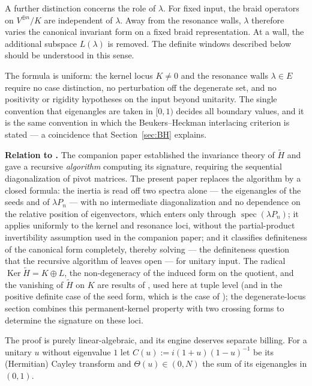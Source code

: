 \documentclass[11pt]{article}
\theoremstyle{definition}
\newcommand{\Ht}{\widetilde H}
\newcommand{\Ker}{\operatorname{Ker}}
\begin{document}
A further distinction concerns the role of $\lambda$. For fixed
input, the braid operators on $V^{\oplus n}/K$ are independent of
$\lambda$. Away from the resonance walls, $\lambda$ therefore varies
the canonical invariant form on a fixed braid representation. At a
wall, the additional subspace $L(\lambda)$ is removed. The definite
windows described below should be understood in this sense.

The formula is uniform: the kernel locus $K\neq0$ and the resonance
walls $\lambda\in E$ require no case distinction, no perturbation off
the degenerate set, and no positivity or rigidity hypotheses on the
input beyond unitarity. The single convention that eigenangles are
taken in $[0,1)$ decides all boundary values, and it is the same
convention in which the Beukers--Heckman interlacing criterion is
stated \cite{BH} --- a coincidence that Section~\ref{sec:BH} explains.


\medskip\noindent
\textbf{Relation to \cite{N-KLM}.} The companion paper \cite{N-KLM} established
the invariance theory of $\Ht$ and gave a recursive \emph{algorithm}
computing its signature, requiring the sequential diagonalization of
pivot matrices. The present paper replaces the algorithm by a closed
formula: the inertia is read off two spectra alone --- the eigenangles
of the seeds and of $\lambda P_n$ --- with no intermediate
diagonalization and no dependence on the relative position of
eigenvectors, which enters only through
$\operatorname{spec}(\lambda P_n)$; it applies uniformly to the
kernel and resonance loci, without the partial-product invertibility
assumption used in the companion paper; and it classifies
definiteness of the canonical form completely, thereby solving
\cite[Problem~18]{N-KLM} --- the definiteness question that the
recursive algorithm of \cite{N-KLM} leaves open --- for unitary
input. The radical $\Ker\Ht=K\oplus L$, the non-degeneracy of the
induced form on the quotient, and the vanishing of $\Ht$ on $K$ are
results of \cite[Thm.~9 and Cor.~13]{N-KLM}, used here at tuple level
(and in the positive definite case of the seed form, which is the case
of \cite[Problem~18]{N-KLM}); the degenerate-locus section combines
this permanent-kernel property with two crossing forms to determine
the signature on these loci.

The proof is purely linear-algebraic, and its engine deserves separate
billing. For a unitary $u$ without eigenvalue $1$ let
$C(u):=i(1+u)(1-u)^{-1}$ be its (Hermitian) Cayley transform and
$\Theta(u)\in(0,N)$ the sum of its eigenangles in $(0,1)$.
\end{document}
